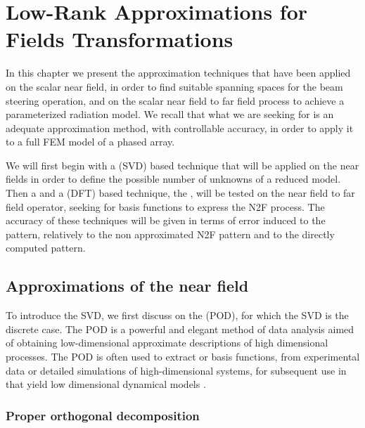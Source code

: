 \graphicspath{{img/ch2/}}
\cleardoublepage
\chapter{Low-Rank Approximations for Fields Transformations} \label{chap:LRA}

\par In this chapter we present the approximation techniques that have been applied on the scalar near field, in order to find suitable spanning spaces for the beam steering operation, and on the scalar near field to far field process to achieve a parameterized radiation model. We recall that what we are seeking for is an adequate approximation method, with controllable accuracy, in order to apply it to a full FEM model of a phased array.
\par We will first begin with a  (SVD) based technique that will be applied on the near fields in order to define the possible number of unknowns of a reduced model. Then a  and a  (DFT) based technique, the , will be tested on the near field to far field operator, seeking for basis functions to express the N2F process. The accuracy of these techniques will be given in terms of error induced to the pattern, relatively to the non approximated N2F pattern and to the directly computed pattern.

\section{Approximations of the near field}

\par To introduce the SVD, we first discuss on the  (POD), for which the SVD is the discrete case. The POD is a powerful and elegant method of data analysis aimed of obtaining low-dimensional approximate descriptions of high dimensional processes. The POD is often used to extract  or basis functions, from experimental data or detailed simulations of high-dimensional systems, for subsequent use in  \cite{ThomeeGFEMP} that yield low dimensional dynamical models \cite{ChatterjeeIPOD}.

\subsection{Proper orthogonal decomposition} \label{sec:POD}

